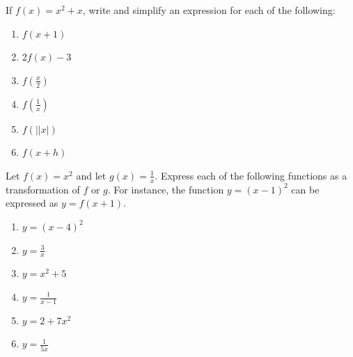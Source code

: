 \documentclass[10pt,]{book}
\theoremstyle{ptxdefinitionnotitle}
\theoremstyle{ptxdefinitiontitle}
\numberwithin{equation}{section}
\begin{document}
\begin{divisionexercise}{8}\hypertarget{exercise-8}{}
\hypertarget{p-37}{}%
If \(f(x) = x^2 + x\), write and simplify an expression for each of the following: \leavevmode%
\begin{enumerate}[label=(\alph*)]
\item\hypertarget{li-38}{}\(f(x+1)\)%
\item\hypertarget{li-39}{}\(2f(x)-3\)%
\item\hypertarget{li-40}{}\(f\left(\frac{x}{2}\right)\)%
\item\hypertarget{li-41}{}\(f\left(\frac{1}{x}\right)\)%
\item\hypertarget{li-42}{}\(f\left(\lvert| x \rvert \right)\)%
\item\hypertarget{li-43}{}\(f(x+h)\)%
\end{enumerate}
%
\end{divisionexercise}%
\begin{divisionexercise}{9}\hypertarget{exercise-9}{}
\hypertarget{p-38}{}%
Let \(f(x) = x^2\) and let \(g(x) = \frac{1}{x}\). Express each of the following functions as a transformation of \(f\) or \(g\). For instance, the function \(y = \left( x-1 \right)^2\) can be expressed as \(y = f(x+1)\). \leavevmode%
\begin{enumerate}[label=(\alph*)]
\item\hypertarget{li-44}{}\(y = (x-4)^2\)%
\item\hypertarget{li-45}{}\(y = \frac{3}{x}\)%
\item\hypertarget{li-46}{}\(y = x^2 + 5\)%
\item\hypertarget{li-47}{}\(y = \frac{1}{x-1}\)%
\item\hypertarget{li-48}{}\(y = 2 + 7x^2\)%
\item\hypertarget{li-49}{}\(y = \frac{1}{5x}\)%
\end{enumerate}
%
\end{divisionexercise}%
\end{document}
